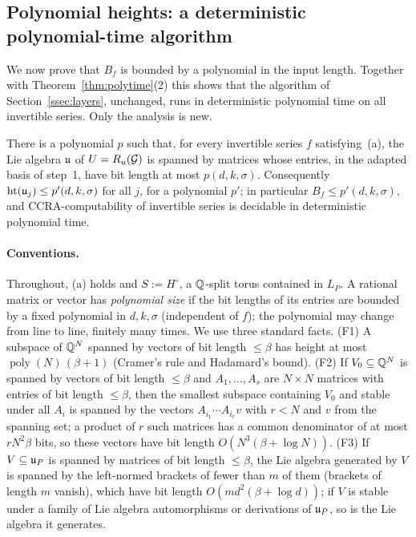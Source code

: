 \subsection{Polynomial heights: a deterministic polynomial-time algorithm}\label{ssec:detpoly}

We now prove that $B_f$ is bounded by a polynomial in the input length. Together with Theorem~\ref{thm:polytime}(2)
this shows that the algorithm of Section~\ref{ssec:layers}, unchanged, runs in deterministic
polynomial time on all invertible series. Only the analysis is new.

\begin{theorem}\label{thm:detpoly}
There is a polynomial $p$ such that, for every invertible series $f$ satisfying~(a), the Lie algebra
$\mathfrak{u}$ of $U=R_u(\mathcal{G})$ is spanned by matrices whose entries, in the adapted basis of step~1, have bit
length at most $p(d,k,\sigma)$. Consequently $\operatorname{ht}(\mathfrak{u}_j)\le p'(d,k,\sigma)$ for all
$j$, for a polynomial $p'$; in particular $B_f\le p'(d,k,\sigma)$, and CCRA-computability of
invertible series is decidable in deterministic polynomial time.
\end{theorem}

\paragraph{Conventions.} Throughout, (a) holds and $S:=H^\circ$, a $\mathbb{Q}$-split torus contained in
$L_P$. A rational matrix or vector has \emph{polynomial size} if the bit lengths of its entries are
bounded by a fixed polynomial in $d,k,\sigma$ (independent of $f$); the polynomial may change from
line to line, finitely many times. We use three standard facts. (F1) A subspace of $\mathbb{Q}^N$ spanned by
vectors of bit length $\le\beta$ has height at most $\operatorname{poly}(N)\,(\beta+1)$ (Cramer's rule
and Hadamard's bound). (F2) If $V_0\subseteq\mathbb{Q}^N$ is spanned by vectors of bit length $\le\beta$ and
$A_1,\ldots,A_s$ are $N\times N$ matrices with entries of bit length $\le\beta$, then the smallest
subspace containing $V_0$ and stable under all $A_i$ is spanned by the vectors $A_{i_1}\cdots
A_{i_r}v$ with $r<N$ and $v$ from the spanning set; a product of $r$ such matrices has a common
denominator of at most $rN^2\beta$ bits, so these vectors have bit length $O(N^3(\beta+\log N))$.
(F3) If $V\subseteq\mathfrak{u}_P$ is spanned by matrices of bit length $\le\beta$, the Lie algebra generated
by $V$ is spanned by the left-normed brackets of fewer than $m$ of them (brackets of length $m$
vanish), which have bit length $O(md^2(\beta+\log d))$; if $V$ is stable under a family of Lie algebra
automorphisms or derivations of $\mathfrak{u}_P$, so is the Lie algebra it generates.

